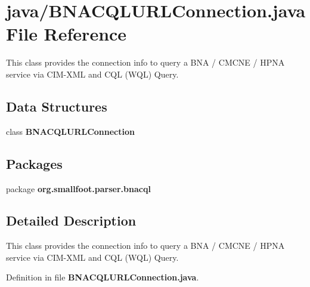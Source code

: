 \section{java/\+B\+N\+A\+C\+Q\+L\+U\+R\+L\+Connection.java File Reference}
\label{BNACQLURLConnection_8java}


This class provides the connection info to query a B\+N\+A / C\+M\+C\+N\+E / H\+P\+N\+A service via C\+I\+M-\/\+X\+M\+L and C\+Q\+L (W\+Q\+L) Query.  


\subsection*{Data Structures}
\begin{DoxyCompactItemize}
\item 
class {\bf B\+N\+A\+C\+Q\+L\+U\+R\+L\+Connection}
\end{DoxyCompactItemize}
\subsection*{Packages}
\begin{DoxyCompactItemize}
\item 
package {\bf org.\+smallfoot.\+parser.\+bnacql}
\end{DoxyCompactItemize}


\subsection{Detailed Description}
This class provides the connection info to query a B\+N\+A / C\+M\+C\+N\+E / H\+P\+N\+A service via C\+I\+M-\/\+X\+M\+L and C\+Q\+L (W\+Q\+L) Query. 



Definition in file {\bf B\+N\+A\+C\+Q\+L\+U\+R\+L\+Connection.\+java}.

